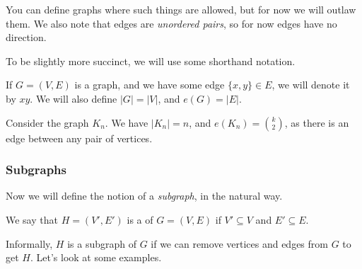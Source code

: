 \documentclass[a4paper]{scrartcl}
\begin{document}
\begin{remark}
\begin{center}

	\end{center}
	 You can define graphs where such things are allowed, but for now we will outlaw them. We also note that edges are \emph{unordered pairs}, so for now edges have no direction.
\end{remark}

To be slightly more succinct, we will use some shorthand notation. 

\begin{notation}
If $G = (V, E)$ is a graph, and we have some edge $\{x, y\} \in E$, we will denote it by $xy$. We will also define $|G| = |V|$, and $e(G) = |E|$.
\end{notation}
 
\begin{example}
	Consider the graph $K_n$. We have $|K_n| = n$, and $e(K_n) = \binom{k}{2}$, as there is an edge between any pair of vertices.
\end{example}

\subsubsection{Subgraphs}

Now we will define the notion of a \emph{subgraph}, in the natural way.

\begin{definition}[Subgraph]
	We say that $H= (V', E')$ is a  of $G = (V, E)$ if $V' \subseteq V$ and $E' \subseteq E$.
\end{definition}

Informally, $H$ is a subgraph of $G$ if we can remove vertices and edges from $G$ to get $H$. Let's look at some examples.
\end{document}
